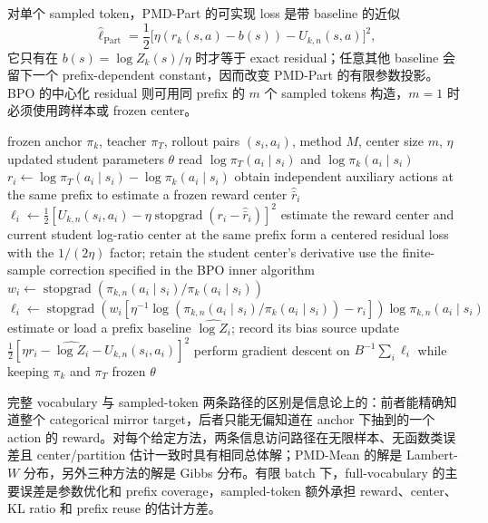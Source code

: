 对单个 sampled token，PMD-Part 的可实现 loss 是带 baseline 的近似
\[
\widehat\ell_{\mathrm{Part}}=\frac12\bigl[\eta(r_k(s,a)-b(s))-U_{k,n}(s,a)\bigr]^2,
\]
它只有在 $b(s)=\log Z_k(s)/\eta$ 时才等于 exact residual；任意其他 baseline 会留下一个 prefix-dependent constant，因而改变 PMD-Part 的有限参数投影。BPO 的中心化 residual 则可用同 prefix 的 $m$ 个 sampled tokens 构造，$m=1$ 时必须使用跨样本或 frozen center。

\begin{algorithm}[ht]
\caption{OPD sampled-token inner update\\{\small\textit{Semantics: 每个 prefix 只访问 rollout 的下一个 token}}}
\begin{algorithmic}[1]
\Require frozen anchor $\pi_k$, teacher $\pi_T$, rollout pairs $(s_i,a_i)$, method $M$, center size $m$, $\eta$
\Ensure updated student parameters $\theta$
    \State read $\log \pi_T(a_i\mid s_i)$ and $\log\pi_k(a_i\mid s_i)$
    \State $r_i\gets\log \pi_T(a_i\mid s_i)-\log\pi_k(a_i\mid s_i)$
        \State obtain independent auxiliary actions at the same prefix to estimate a frozen reward center $\widehat{\bar r}_i$
        \State $\ell_i\gets\frac12[U_{k,n}(s_i,a_i)-\eta\operatorname{stopgrad}(r_i-\widehat{\bar r}_i)]^2$
        \State estimate the reward center and current student log-ratio center at the same prefix
        \State form a centered residual loss with the $1/(2\eta)$ factor; retain the student center's derivative
        \State use the finite-sample correction specified in the BPO inner algorithm
        \State $w_i\gets\operatorname{stopgrad}\!\left(\pi_{k,n}(a_i\mid s_i)/\pi_k(a_i\mid s_i)\right)$
        \State $\ell_i\gets\operatorname{stopgrad}\!\left(w_i[\eta^{-1}\log(\pi_{k,n}(a_i\mid s_i)/\pi_k(a_i\mid s_i))-r_i]\right)\log\pi_{k,n}(a_i\mid s_i)$
        \State estimate or load a prefix baseline $\widehat{\log Z_i}$; record its bias source
        \State update $\frac12[\eta r_i-\widehat{\log Z_i}-U_{k,n}(s_i,a_i)]^2$
    \EndIf
\EndFor
\State perform gradient descent on $B^{-1}\sum_i\ell_i$ while keeping $\pi_k$ and $\pi_T$ frozen
\State \Return $\theta$
\end{algorithmic}
\end{algorithm}

完整 vocabulary 与 sampled-token 两条路径的区别是信息论上的：前者能精确知道整个 categorical mirror target，后者只能无偏知道在 anchor 下抽到的一个 action 的 reward。对每个给定方法，两条信息访问路径在无限样本、无函数类误差且 center/partition 估计一致时具有相同总体解；PMD-Mean 的解是 Lambert-$W$ 分布，另外三种方法的解是 Gibbs 分布。有限 batch 下，full-vocabulary 的主要误差是参数优化和 prefix coverage，sampled-token 额外承担 reward、center、KL ratio 和 prefix reuse 的估计方差。

